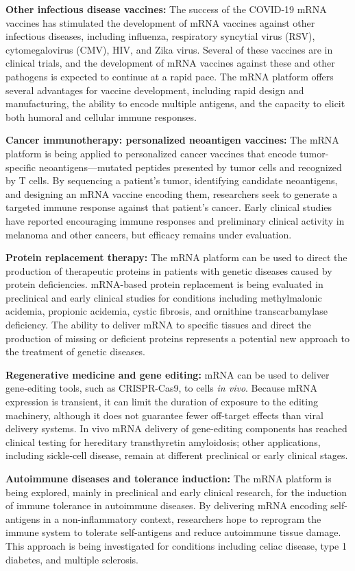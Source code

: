 \textbf{Other infectious disease vaccines:} The success of the COVID-19 mRNA vaccines has stimulated the development of mRNA vaccines against other infectious diseases, including influenza, respiratory syncytial virus (RSV), cytomegalovirus (CMV), HIV, and Zika virus. Several of these vaccines are in clinical trials, and the development of mRNA vaccines against these and other pathogens is expected to continue at a rapid pace. The mRNA platform offers several advantages for vaccine development, including rapid design and manufacturing, the ability to encode multiple antigens, and the capacity to elicit both humoral and cellular immune responses.

\textbf{Cancer immunotherapy: personalized neoantigen vaccines:} The mRNA platform is being applied to personalized cancer vaccines that encode tumor-specific neoantigens---mutated peptides presented by tumor cells and recognized by T cells. By sequencing a patient's tumor, identifying candidate neoantigens, and designing an mRNA vaccine encoding them, researchers seek to generate a targeted immune response against that patient's cancer. Early clinical studies have reported encouraging immune responses and preliminary clinical activity in melanoma and other cancers, but efficacy remains under evaluation.

\textbf{Protein replacement therapy:} The mRNA platform can be used to direct the production of therapeutic proteins in patients with genetic diseases caused by protein deficiencies. mRNA-based protein replacement is being evaluated in preclinical and early clinical studies for conditions including methylmalonic acidemia, propionic acidemia, cystic fibrosis, and ornithine transcarbamylase deficiency. The ability to deliver mRNA to specific tissues and direct the production of missing or deficient proteins represents a potential new approach to the treatment of genetic diseases.

\textbf{Regenerative medicine and gene editing:} mRNA can be used to deliver gene-editing tools, such as CRISPR-Cas9, to cells \textit{in vivo}. Because mRNA expression is transient, it can limit the duration of exposure to the editing machinery, although it does not guarantee fewer off-target effects than viral delivery systems. In vivo mRNA delivery of gene-editing components has reached clinical testing for hereditary transthyretin amyloidosis; other applications, including sickle-cell disease, remain at different preclinical or early clinical stages.

\textbf{Autoimmune diseases and tolerance induction:} The mRNA platform is being explored, mainly in preclinical and early clinical research, for the induction of immune tolerance in autoimmune diseases. By delivering mRNA encoding self-antigens in a non-inflammatory context, researchers hope to reprogram the immune system to tolerate self-antigens and reduce autoimmune tissue damage. This approach is being investigated for conditions including celiac disease, type 1 diabetes, and multiple sclerosis.

